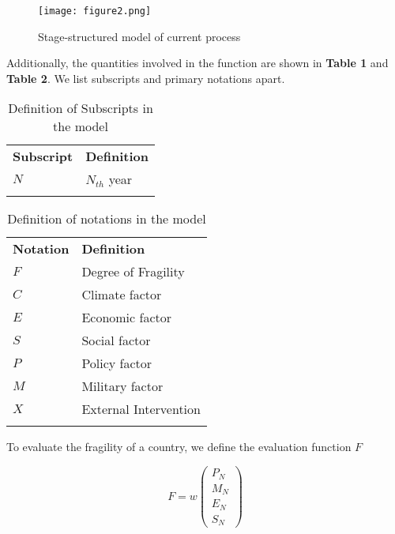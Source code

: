 \documentclass{mcmthesis}
\newlength\savedwidth
\newcommand\whline{\noalign{\global\savedwidth\arrayrulewidth
		\global\arrayrulewidth 1.2pt}%
	\hline
	\noalign{\global\arrayrulewidth\savedwidth}}
\newlength\savewidth
\newcommand\shline{\noalign{\global\savewidth\arrayrulewidth
		\global\arrayrulewidth 1.2pt}%
	\hline
	\noalign{\global\arrayrulewidth\savewidth}}
\begin{document}
	\begin{figure}[h]
		\small
		\centering
		\texttt{[image: figure2.png]}
		\caption{Stage-structured model of current process} \label{fig:Stage-structured model of current process}
	\end{figure}
	
	\noindent Additionally, the quantities involved in the function are shown in \textbf{Table 1} and \textbf{Table 2}. We list subscripts and primary notations apart.\\
	
	\begin{table}[htbp]
		\renewcommand\arraystretch{1.5}
		\footnotesize
		\centering
		\begin{tabular}{m{3cm}<{\centering}|m{10cm}<{\centering}}
			\whline
			\textbf{Subscript}&\textbf{Definition}\\
			\whline 
			$N$&$N_{th}$ year\\ 
			\shline
		\end{tabular}
		\caption{Definition of Subscripts in the model}\label{tab:Definition of Subscripts in the model}
	\end{table}
	\begin{table}[htbp]
		\renewcommand\arraystretch{1.5}
		\footnotesize
		\centering
		\begin{tabular}{m{3cm}<{\centering}|m{10cm}<{\centering}}
			\whline
			\textbf{Notation}&\textbf{Definition}\\
			\whline 
			$F$&Degree of Fragility\\
			$C$&Climate factor\\
			$E$&Economic factor\\
			$S$&Social factor\\
			$P$&Policy factor\\ 
			$M$&Military factor\\
			$X$&External Intervention\\
			\shline
		\end{tabular}
		\caption{Definition of notations in the model}\label{tab:Definition of notations in the model}
	\end{table}
	
	To evaluate the fragility of a country, we define the evaluation function $F$
	
	\begin{equation}
	F = w 
	\left(
	\begin{matrix}
	P_N \\ M_N \\ E_N \\ S_N
	\end{matrix}
	\right)
	\end{equation}
	
\end{document}
